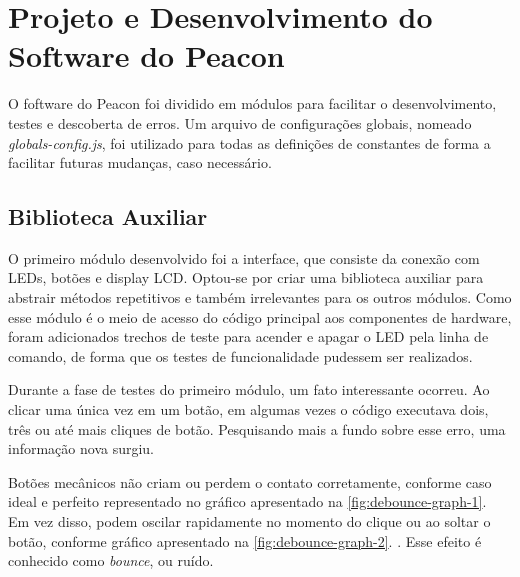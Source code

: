 \section{Projeto e Desenvolvimento do Software do Peacon}\label{sec:terceira-etapa}

O foftware do Peacon foi dividido em módulos para facilitar o desenvolvimento, testes e descoberta de erros. Um arquivo de configurações globais, nomeado \textit{globals-config.js}, foi utilizado para todas as definições de constantes de forma a facilitar futuras mudanças, caso necessário. 

\subsection{Biblioteca Auxiliar}\label{sec:primeiro-modulo}

O primeiro módulo desenvolvido foi a interface, que consiste da conexão com LEDs, botões e display LCD. Optou-se por criar uma biblioteca auxiliar para abstrair métodos repetitivos e também irrelevantes para os outros módulos. Como esse módulo é o meio de acesso do código principal aos componentes de hardware, foram adicionados trechos de teste para acender e apagar o LED pela linha de comando, de forma que os testes de funcionalidade pudessem ser realizados.

Durante a fase de testes do primeiro módulo, um fato interessante ocorreu. Ao clicar uma única vez em um botão, em algumas vezes o código executava dois, três ou até mais cliques de botão. Pesquisando mais a fundo sobre esse erro, uma informação nova surgiu. 

Botões mecânicos não criam ou perdem o contato corretamente, conforme caso ideal e perfeito representado no gráfico apresentado na \autoref{fig:debounce-graph-1}. Em vez disso, podem oscilar rapidamente no momento do clique ou ao soltar o botão, conforme gráfico apresentado na \autoref{fig:debounce-graph-2}. \cite{debounce-graph}. Esse efeito é conhecido como \textit{bounce}, ou ruído.

